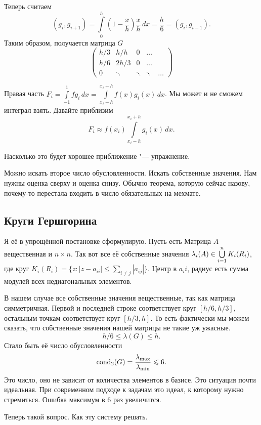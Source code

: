 Теперь считаем
\[
  (g_i,g_{i+1}) = \int\limits_0^h\left(1-\frac xh\right)\frac xh\,dx = \frac h6 = (g_i,g_{i-1}).
\]
Таким образом, получается матрица $G$
\[
  \begin{pmatrix}
    h/3 & h/h & 0 &\dots\\
    h/6 & 2h/3 & 0 & \dots\\
    0 & \ddots & \ddots & \ddots &\dots
  \end{pmatrix}
\]

Правая часть $F_i = \int\limits_{-1}^1 fg_i\,dx = \int\limits_{x_i-h}^{x_i+h} f(x) g_i(x)\,dx$. Мы может и не сможем интеграл взять. Давайте приблизим
\[
  F_i \approx  f(x_i) \int\limits_{x_i-h}^{x_i+h} g_i(x)\,dx.
\]

Насколько это будет хорошее приближение "--- упражнение.

Можно искать второе число обусловленности. Искать собственные значения. Нам нужны оценка сверху и оценка снизу. Обычно теорема, которую сейчас назову, почему-то перестала входить в число обязательных на мехмате.
\subsection{Круги Гершгорина}
Я её в упрощённой постановке сформулирую. Пусть есть Матрица $A$ вещественная и $n\times n$. Так вот все её собственные значения $\lambda_i(A)\in \bigcup\limits_{i=1}^{n} K_i(R_i)$, где круг $K_i(R_i) = \big\{z\colon |z - a_{ii}|\le\sum\limits_{i\ne j}|a_{ij}|\big\}$. Центр в $a_ii$, радиус есть сумма модулей всех недиагональных элементов.

В нашем случае все собственные значения вещественные, так как матрица симметричная. Первой и последней строке соответствует круг $[h/6,h/3]$, остальным точкам соответствует круг $[h/3,h]$. То есть фактически мы можем сказать, что собственные значения нашей матрицы не такие уж ужасные.
\[
  h/6\le \lambda(G)\le h.
\]
Стало быть её число обусловленности
\[
  \operatorname{cond}_2(G) = \frac{\lambda_{\max}}{\lambda_{\min}}\leqslant 6.
\]
Это число, оно не зависит от количества элементов в базисе. Это ситуация почти идеальная. При современном подходе к задачам это идеал, к которому нужно стремиться. Ошибка максимум в 6 раз увеличится.

Теперь такой вопрос. Как эту систему решать.
